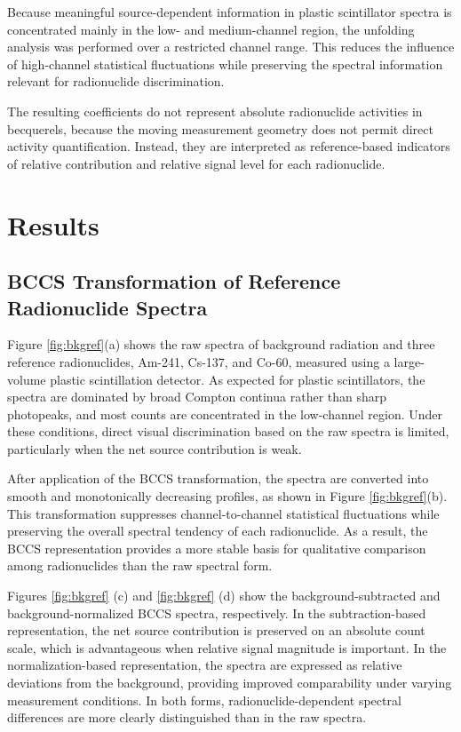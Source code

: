 \documentclass[10pt]{wlscirep}
\begin{document}
Because meaningful source-dependent information in plastic scintillator spectra is concentrated mainly in the low- and medium-channel region, the unfolding analysis was performed over a restricted channel range. This reduces the influence of high-channel statistical fluctuations while preserving the spectral information relevant for radionuclide discrimination.

The resulting coefficients do not represent absolute radionuclide activities in becquerels, because the moving measurement geometry does not permit direct activity quantification. Instead, they are interpreted as reference-based indicators of relative contribution and relative signal level for each radionuclide.
\normalcolor


\section*{Results}


\subsection*{BCCS Transformation of Reference Radionuclide Spectra}

Figure \ref{fig:bkgref}(a) shows the raw spectra of background radiation and three reference radionuclides, Am-241, Cs-137, and Co-60, measured using a large-volume plastic scintillation detector. As expected for plastic scintillators, the spectra are dominated by broad Compton continua rather than sharp photopeaks, and most counts are concentrated in the low-channel region. Under these conditions, direct visual discrimination based on the raw spectra is limited, particularly when the net source contribution is weak.

After application of the BCCS transformation, the spectra are converted into smooth and monotonically decreasing profiles, as shown in Figure \ref{fig:bkgref}(b). This transformation suppresses channel-to-channel statistical fluctuations while preserving the overall spectral tendency of each radionuclide. As a result, the BCCS representation provides a more stable basis for qualitative comparison among radionuclides than the raw spectral form.

Figures \ref{fig:bkgref} (c) and \ref{fig:bkgref} (d) show the background-subtracted and background-normalized BCCS spectra, respectively. In the subtraction-based representation, the net source contribution is preserved on an absolute count scale, which is advantageous when relative signal magnitude is important. In the normalization-based representation, the spectra are expressed as relative deviations from the background, providing improved comparability under varying measurement conditions. In both forms, radionuclide-dependent spectral differences are more clearly distinguished than in the raw spectra.
\end{document}
